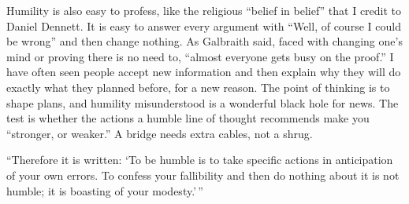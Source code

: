 Humility is also easy to profess, like the religious ``belief in belief'' that I credit to Daniel Dennett. It is easy to answer every argument with ``Well, of course I could be wrong'' and then change nothing. As Galbraith said, faced with changing one's mind or proving there is no need to, ``almost everyone gets busy on the proof.'' I have often seen people accept new information and then explain why they will do exactly what they planned before, for a new reason. The point of thinking is to shape plans, and humility misunderstood is a wonderful black hole for news. The test is whether the actions a humble line of thought recommends make you ``stronger, or weaker.'' A bridge needs extra cables, not a shrug.

``Therefore it is written: `To be humble is to take specific actions in anticipation of your own errors. To confess your fallibility and then do nothing about it is not humble; it is boasting of your modesty.'\,'' 
